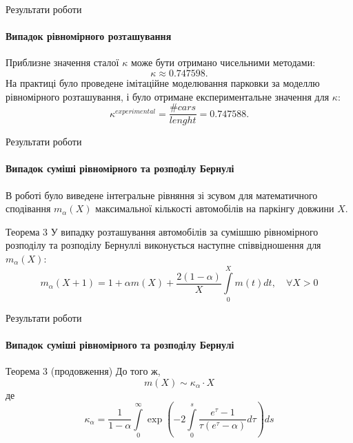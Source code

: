 \begin{frame}{Результати роботи}
	\framesubtitle{Випадок рівномірного розташування}
	\manimate
	Приблизне значення сталої $\kappa$ може бути отримано чисельними методами:
	\[
		\kappa \approx 0.747598.
	\]
	На практиці було проведене імітаційне моделювання парковки за моделлю рівномірного розташування, і було отримане експериментальне значення для $\kappa$:
	\[
		\kappa^{experimental} = \frac{\#cars}{lenght} = 0.747588.
	\]
\end{frame}


\begin{frame}{Результати роботи}
	\framesubtitle{Випадок суміші рівномірного та розподілу Бернулі}
	\manimate
	В роботі було виведене інтегральне рівняння зі зсувом для математичного сподівання $m_\alpha(X)$ максимальної кількості автомобілів на паркінгу довжини $X$.
	\begin{block}{Теорема 3}
	У випадку розташування автомобілів за сумішшю рівномірного розподілу та розподілу Бернуллі виконується наступне співвідношення для $m_\alpha(X)$:
        \[
		m_\alpha(X + 1) = 1 + \alpha m(X) + \frac{2(1-\alpha)}{X} \int\limits_0^{X} m(t) dt,\quad \forall X > 0
        \]
	\end{block}
\end{frame}

\begin{frame}{Результати роботи}
	\framesubtitle{Випадок суміші рівномірного та розподілу Бернулі}
	\manimate
	\begin{block}{Теорема 3 (продовження)}
		До того ж,
		\[
	m(X) \sim  \kappa_\alpha \cdot X
		\]
		де
		\[
			\kappa_\alpha = \frac{1}{1-\alpha}  \int\limits_0^\infty \exp\left( -2\int\limits_0^s \frac{e^{\tau} - 1}{\tau(e^\tau - \alpha)} d\tau  \right) ds 
		\]
	\end{block}
\end{frame}

